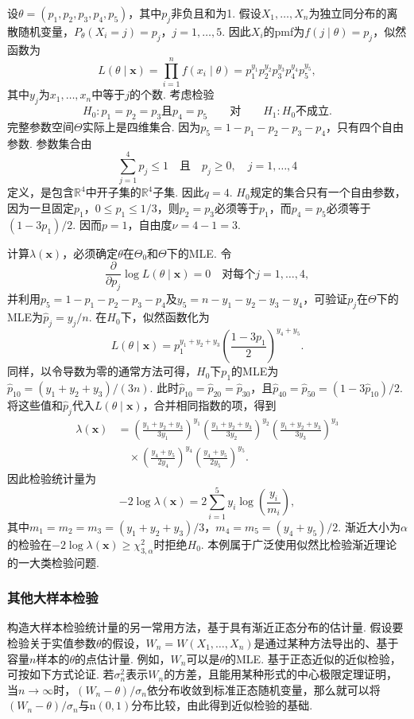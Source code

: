 \begin{example}[多项LRT]\label{ex:10.3.4}
设$\theta=(p_1,p_2,p_3,p_4,p_5)$，其中$p_j$非负且和为1. 假设$X_1,\ldots,X_n$为独立同分布的离散随机变量，$P_\theta(X_i=j)=p_j$，$j=1,\ldots,5$. 因此$X_i$的pmf为$f(j\mid\theta)=p_j$，似然函数为
$$L(\theta\mid\boldsymbol x)=\prod_{i=1}^nf(x_i\mid\theta)=p_1^{y_1}p_2^{y_2}p_3^{y_3}p_4^{y_4}p_5^{y_5},$$
其中$y_j$为$x_1,\ldots,x_n$中等于$j$的个数. 考虑检验
$$H_0:p_1=p_2=p_3\text{且}p_4=p_5\qquad\text{对}\qquad H_1:H_0\text{不成立}.$$
完整参数空间$\Theta$实际上是四维集合. 因为$p_5=1-p_1-p_2-p_3-p_4$，只有四个自由参数. 参数集合由
$$\sum_{j=1}^4p_j\leq1\quad\text{且}\quad p_j\geq0,\quad j=1,\ldots,4$$
定义，是包含$\mathbb R^4$中开子集的$\mathbb R^4$子集. 因此$q=4$. $H_0$规定的集合只有一个自由参数，因为一旦固定$p_1$，$0\leq p_1\leq1/3$，则$p_2=p_3$必须等于$p_1$，而$p_4=p_5$必须等于$(1-3p_1)/2$. 因而$p=1$，自由度$\nu=4-1=3$.

计算$\lambda(\boldsymbol x)$，必须确定$\theta$在$\Theta_0$和$\Theta$下的MLE. 令
$$\frac\partial{\partial p_j}\log L(\theta\mid\boldsymbol x)=0\quad\text{对每个$j=1,\ldots,4$},$$
并利用$p_5=1-p_1-p_2-p_3-p_4$及$y_5=n-y_1-y_2-y_3-y_4$，可验证$p_j$在$\Theta$下的MLE为$\hat p_j=y_j/n$. 在$H_0$下，似然函数化为
$$L(\theta\mid\boldsymbol x)=p_1^{y_1+y_2+y_3}\left(\frac{1-3p_1}2\right)^{y_4+y_5}.$$
同样，以令导数为零的通常方法可得，$H_0$下$p_1$的MLE为$\hat p_{10}=(y_1+y_2+y_3)/(3n)$. 此时$\hat p_{10}=\hat p_{20}=\hat p_{30}$，且$\hat p_{40}=\hat p_{50}=(1-3\hat p_{10})/2$. 将这些值和$\hat p_j$代入$L(\theta\mid\boldsymbol x)$，合并相同指数的项，得到
$$\begin{aligned}
\lambda(\boldsymbol x)&=\left(\frac{y_1+y_2+y_3}{3y_1}\right)^{y_1}\left(\frac{y_1+y_2+y_3}{3y_2}\right)^{y_2}\left(\frac{y_1+y_2+y_3}{3y_3}\right)^{y_3}\\
&\quad\times\left(\frac{y_4+y_5}{2y_4}\right)^{y_4}\left(\frac{y_4+y_5}{2y_5}\right)^{y_5}.
\end{aligned}$$
因此检验统计量为
\begin{equation}\label{eq:10.3.2}
-2\log\lambda(\boldsymbol x)=2\sum_{i=1}^5y_i\log\left(\frac{y_i}{m_i}\right),
\end{equation}
其中$m_1=m_2=m_3=(y_1+y_2+y_3)/3$，$m_4=m_5=(y_4+y_5)/2$. 渐近大小为$\alpha$的检验在$-2\log\lambda(\boldsymbol x)\geq\chi_{3,\alpha}^2$时拒绝$H_0$. 本例属于广泛使用似然比检验渐近理论的一大类检验问题.
\end{example}

\subsubsection{其他大样本检验}\label{sec:10.3.2}
构造大样本检验统计量的另一常用方法，基于具有渐近正态分布的估计量. 假设要检验关于实值参数$\theta$的假设，$W_n=W(X_1,\ldots,X_n)$是通过某种方法导出的、基于容量$n$样本的$\theta$的点估计量. 例如，$W_n$可以是$\theta$的MLE. 基于正态近似的近似检验，可按如下方式论证. 若$\sigma_n^2$表示$W_n$的方差，且能用某种形式的中心极限定理证明，当$n\to\infty$时，$(W_n-\theta)/\sigma_n$依分布收敛到标准正态随机变量，那么就可以将$(W_n-\theta)/\sigma_n$与$\mathrm n(0,1)$分布比较，由此得到近似检验的基础.

